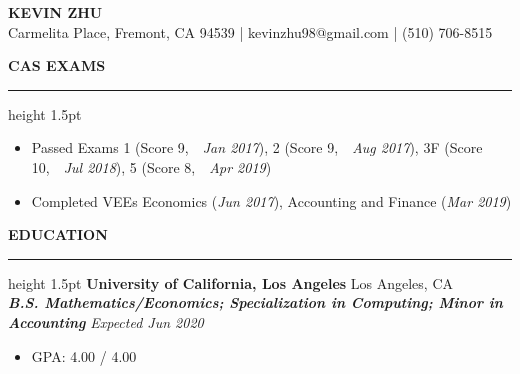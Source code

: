 \documentclass[11pt,letterpaper]{article}
\newcommand{\sectline}{\vspace{4pt}\hrule height 1.5pt\vspace{4pt}}
\newcommand{\sectspace}{\vspace{10pt}}
\begin{document}
\centering
{\fontsize{13pt}{13pt}\selectfont \textbf{KEVIN ZHU}} \vspace{2pt} \\
{\fontsize{11pt}{13pt} Carmelita Place, Fremont, CA 94539 | kevinzhu98@gmail.com | (510) 706-8515}
\sectspace

\fontsize{11pt}{13pt}\selectfont
\raggedright
\textbf{CAS EXAMS}\sectline
\begin{itemize}
	\item Passed Exams 1 (Score 9,~~\textit{Jan 2017}), 2 (Score 9,~~\textit{Aug 2017}), 3F (Score 10,~~\textit{Jul 2018}), 5 (Score 8,~~\textit{Apr 2019})
	\item Completed VEEs Economics (\textit{Jun 2017}), Accounting and Finance (\textit{Mar 2019})	
\end{itemize}
\sectspace

\textbf{EDUCATION}\sectline
\textbf{University of California, Los Angeles} \hfill Los Angeles, CA \\
\textbf{\textit{B.S. Mathematics/Economics; Specialization in Computing; Minor in Accounting}} \hfill \textit{Expected Jun 2020}
\begin{itemize}
	\item GPA: 4.00 / 4.00
\end{itemize}
\sectspace
\end{document}

